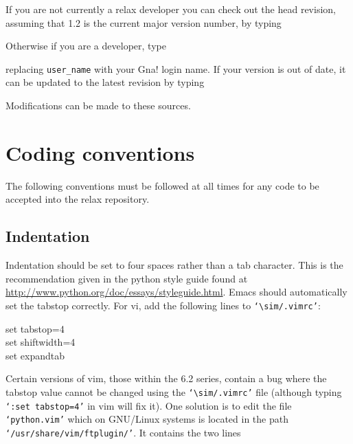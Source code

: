 If you are not currently a relax developer you can check out the head revision, assuming that 1.2 is the current major version number, by typing


Otherwise if you are a developer, type


replacing \texttt{user\_name} with your Gna! login name.  If your version is out of date, it can be updated to the latest revision by typing


Modifications can be made to these sources.




\section{Coding conventions}

The following conventions must be followed at all times for any code to be accepted into the relax repository.



\subsection{Indentation}

Indentation should be set to four spaces rather than a tab character.  This is the recommendation given in the python style guide found at \href{http://www.python.org/doc/essays/styleguide.html}{http://www.python.org/doc/essays/styleguide.html}.  Emacs should automatically set the tabstop correctly.  For vi, add the following lines to \texttt{`$\sim$/.vimrc'}:

\begin{exampleenv}
set tabstop=4 \\
set shiftwidth=4 \\
set expandtab
\end{exampleenv}

Certain versions of vim, those within the 6.2 series, contain a bug where the tabstop value cannot be changed using the \texttt{`$\sim$/.vimrc'} file (although typing \texttt{`:set tabstop=4'} in vim will fix it).  One solution is to edit the file \texttt{`python.vim'} which on GNU/Linux systems is located in the path \texttt{`/usr/share/vim/ftplugin/'}.  It contains the two lines

